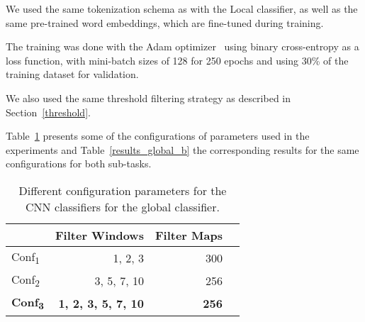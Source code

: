 \documentclass[11pt,a4paper]{article}
\begin{document}
We used the same tokenization schema as with the Local classifier, as well
as the same pre-trained word embeddings, which are fine-tuned during training.

The training was done with the Adam optimizer~\cite{journals/corr/KingmaB14}
using binary cross-entropy as a loss function, with mini-batch sizes of 128 for
250 epochs and using 30\% of the training dataset for validation.

We also used the same threshold filtering strategy as described in Section~\ref{threshold}.

Table~\ref{subtask_b_parameters_global} presents some of the configurations of
parameters used in the experiments and Table~\ref{results_global_b} the
corresponding results for the same configurations for both sub-tasks.

\begin{table}[!h]
\begin{center}
\begin{tabular}{|l|r|r|r|}
\hline\centering\textbf{}  & \textbf{Filter Windows} &  \textbf{Filter Maps} \\
\hline
Conf\textsubscript{1} &           1, 2, 3  &  300 \\
Conf\textsubscript{2} &        3, 5, 7, 10 &  256 \\
\textbf{Conf\textsubscript{3}} &  \textbf{1, 2, 3, 5, 7, 10} &  \textbf{256} \\
\hline
\end{tabular}
\end{center}
\caption{\label{subtask_b_parameters_global} Different configuration parameters
for the CNN classifiers for the global classifier.}
\end{table}
\end{document}

